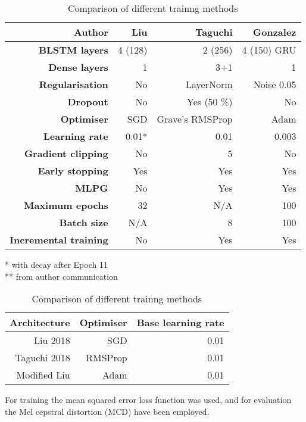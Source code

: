 \documentclass[a4paper]{article}
\begin{document}
\begin{table}[th]
  \caption{Comparison of different trainng methods}
  \label{tab:example}
  \centering
  \footnotesize

  \begin{tabular}{ r r r r }
    \toprule
    \textbf{Author} & \textbf{Liu} & \textbf{Taguchi} & \textbf{Gonzalez} \\
    \midrule
    \textbf{BLSTM layers} & 4 (128) & 2 (256) & 4 (150) GRU \\
    \textbf{Dense layers} & 1 & 3+1 & 1 \\
    \textbf{Regularisation} & No & LayerNorm & Noise 0.05 \\
    \textbf{Dropout} & No & Yes (50 \%) & No \\
    \textbf{Optimiser} & SGD & Grave's RMSProp & Adam \\
    \textbf{Learning rate} & 0.01* & 0.01 & 0.003 \\
    \textbf{Gradient clipping} & No & 5 & No \\
    \textbf{Early stopping} & Yes & Yes & Yes \\
    \textbf{MLPG} & No & Yes & Yes \\ 
    \textbf{Maximum epochs} & 32 & N/A & 100 \\
    \textbf{Batch size} & N/A & 8 & 100 \\
    \textbf{Incremental training} & No & Yes & Yes
    \bottomrule
    
    
  \end{tabular}
  * with decay after Epoch 11 \\
  ** from author communication
\end{table}
\begin{table}[th]
  \caption{Comparison of different trainng methods}
  \label{tab:example}
  \centering
  \begin{tabular}{ r r r }
    \toprule
    \textbf{Architecture} & \textbf{Optimiser} & \textbf{Base learning rate} \\
    \midrule
    Liu 2018 & SGD & 0.01 \\
    Taguchi 2018 & RMSProp & 0.01       \\
    Modified Liu & Adam & 0.01               \\
    \bottomrule
  \end{tabular}
  
\end{table}

For training the mean squared error loss function was used, and for
evaluation the Mel cepstral distortion (MCD) have been employed. \cite{Kubichek1993}
\end{document}
